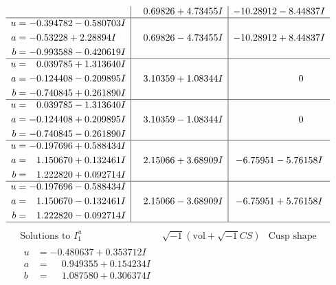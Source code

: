 \documentclass[1p]{elsarticle_modified}
\theoremstyle{definition}
\newcommand{\I}{\sqrt{-1}}
\begin{document}
$$\begin{array}{c|c|c}
 & \phantom{-}0.69826 + 4.73455 I & -10.28912 - 8.44837 I \\ \hline\begin{aligned}
u &= -0.394782 - 0.580703 I \\
a &= -0.53228 + 2.28894 I \\
b &= -0.993588 - 0.420619 I\end{aligned}
 & \phantom{-}0.69826 - 4.73455 I & -10.28912 + 8.44837 I \\ \hline\begin{aligned}
u &= \phantom{-}0.039785 + 1.313640 I \\
a &= -0.124408 - 0.209895 I \\
b &= -0.740845 + 0.261890 I\end{aligned}
 & \phantom{-}3.10359 + 1.08344 I & \phantom{-0.000000 } 0 \\ \hline\begin{aligned}
u &= \phantom{-}0.039785 - 1.313640 I \\
a &= -0.124408 + 0.209895 I \\
b &= -0.740845 - 0.261890 I\end{aligned}
 & \phantom{-}3.10359 - 1.08344 I & \phantom{-0.000000 } 0 \\ \hline\begin{aligned}
u &= -0.197696 + 0.588434 I \\
a &= \phantom{-}1.150670 + 0.132461 I \\
b &= \phantom{-}1.222820 + 0.092714 I\end{aligned}
 & \phantom{-}2.15066 + 3.68909 I & -6.75951 - 5.76158 I \\ \hline\begin{aligned}
u &= -0.197696 - 0.588434 I \\
a &= \phantom{-}1.150670 - 0.132461 I \\
b &= \phantom{-}1.222820 - 0.092714 I\end{aligned}
 & \phantom{-}2.15066 - 3.68909 I & -6.75951 + 5.76158 I\\
 \hline 
 \end{array}$$\newpage$$\begin{array}{c|c|c}  
\text{Solutions to }I^u_{1}& \I (\text{vol} + \sqrt{-1}CS) & \text{Cusp shape}\\
 \hline 
\begin{aligned}
u &= -0.480637 + 0.353712 I \\
a &= \phantom{-}0.949355 + 0.154234 I \\
b &= \phantom{-}1.087580 + 0.306374 I\end{aligned}

\end{array}$$
\end{document}
